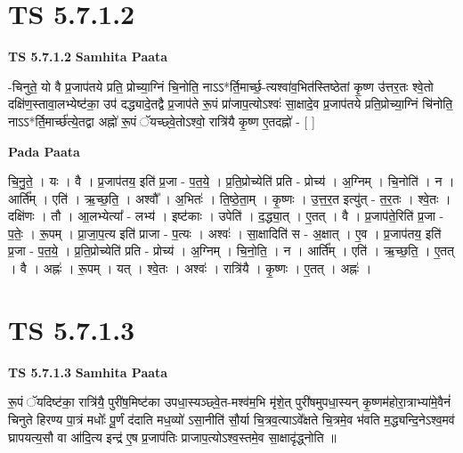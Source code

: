 \documentclass[17pt]{extarticle}
\begin{document}
\section*{ TS 5.7.1.2 }

\textbf{TS 5.7.1.2 } \newline
\textbf{Samhita Paata} \newline

-चिनुते॒ यो वै प्र॒जाप॑तये प्रति॒ प्रोच्या॒ग्निं चि॒नोति॒ नाऽऽ*र्ति॒मार्च्छ॒-त्यश्वा॑व॒भित॑स्तिष्ठेतां कृ॒ष्ण उ॑त्तर॒तः श्वे॒तो दक्षि॑ण॒स्तावा॒लभ्येष्ट॑का॒ उप॑ दद्ध्यादे॒तद्वै प्र॒जाप॑ते रू॒पं प्रा॑जाप॒त्योऽश्वः॑ सा॒क्षादे॒व प्र॒जाप॑तये प्रति॒प्रोच्या॒ग्निं चि॑नोति॒ नाऽऽ*र्ति॒मार्च्छ॑त्ये॒तद्वा अह्नो॑ रू॒पं ॅयच्छ्वे॒तोऽश्वो॒ रात्रि॑यै कृ॒ष्ण ए॒तदह्नो॑ - [  ] \newline

\textbf{Pada Paata} \newline

चि॒नु॒ते॒ । यः । वै । प्र॒जाप॑तय॒ इति॑ प्र॒जा -  प॒त॒ये॒ । प्र॒ति॒प्रोच्येति॑ प्रति - प्रोच्य॑ । अ॒ग्निम् । चि॒नोति॑ । न । आर्ति᳚म् । एति॑ । ऋ॒च्छ॒ति॒ । अश्वौ᳚ । अ॒भितः॑ । ति॒ष्ठे॒ता॒म् । कृ॒ष्णः । उ॒त्त॒र॒त इत्यु॑त् -   त॒र॒तः । श्वे॒तः । दक्षि॑णः । तौ । आ॒लभ्येत्या᳚ - लभ्य॑ । इष्ट॑काः । उपेति॑ । द॒द्ध्या॒त् । ए॒तत् । वै । प्र॒जाप॑ते॒रिति॑ प्र॒जा - प॒तेः॒ । रू॒पम् । प्रा॒जा॒प॒त्य इति॑ प्राजा - प॒त्यः । अश्वः॑ । सा॒क्षादिति॑ स - अ॒क्षात् । ए॒व । प्र॒जाप॑तय॒ इति॑ प्र॒जा - प॒त॒ये॒ । प्र॒ति॒प्रोच्येति॑ प्रति - प्रोच्य॑ । अ॒ग्निम् । चि॒नो॒ति॒ । न । आर्ति᳚म् । एति॑ । ऋ॒च्छ॒ति॒ । ए॒तत् । वै । अह्नः॑ । रू॒पम् । यत् । श्वे॒तः । अश्वः॑ । रात्रि॑यै । कृ॒ष्णः । ए॒तत् । अह्नः॑ ।  \newline




\section*{ TS 5.7.1.3 }

\textbf{TS 5.7.1.3 } \newline
\textbf{Samhita Paata} \newline

रू॒पं ॅयदिष्ट॑का॒ रात्रि॑यै॒ पुरी॑ष॒मिष्ट॑का उपधा॒स्यञ्छ्वे॒त-मश्व॑म॒भि मृ॑शे॒त् पुरी॑षमुपधा॒स्यन् कृ॒ष्णम॑होरा॒त्राभ्या॑मे॒वैनं॑ चिनुते हिरण्य पा॒त्रं मधोः᳚ पू॒र्णं द॑दाति मध॒व्यो॑ ऽसा॒नीति॑ सौ॒र्या चि॒त्रव॒त्याऽवे᳚क्षते चि॒त्रमे॒व भ॑वति म॒द्ध्यन्दि॒नेऽश्व॒मव॑ घ्रापयत्य॒सौ वा आ॑दि॒त्य इन्द्र॑ ए॒ष प्र॒जाप॑तिः प्राजाप॒त्योऽश्व॒स्तमे॒व सा॒क्षादृ॑द्ध्नोति ॥ \newline
\end{document}
